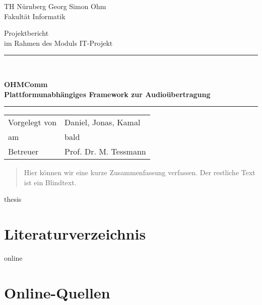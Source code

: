 \documentclass[11pt,a4paper]{report}
\begin{document}
\begin{titlepage}
  \begin{center}
    \parbox[t]{8cm}{
      TH Nürnberg Georg Simon Ohm\\
      Fakultät Informatik \\
	}
    \vfill    
    {\LARGE Projektbericht} \\[0.5cm]
    {\large im Rahmen des Moduls IT-Projekt} \\[5mm]
    \rule{\textwidth}{1pt}\\[0.5cm]
    {\begin{spacing}{1.15} \huge \bfseries OHMComm \\Plattformunabhängiges Framework zur Audioübertragung \\ \end{spacing}}
    \rule{\textwidth}{1pt}    
    \vfill    
    \begin{tabular}{ll} %
      Vorgelegt von & Daniel, Jonas, Kamal \\
      am & bald \\
      Betreuer & Prof. Dr. M. Tessmann \\
    \end{tabular}    
    \vfill
\end{center}
\end{titlepage}
\cleardoublepage

\begin{abstract} 
Hier können wir eine kurze Zusammenfassung verfassen. Der restliche Text ist ein Blindtext. \blindtext
\end{abstract}

\tableofcontents




































\begin{btSect}{thesis} %
\section*{Literaturverzeichnis}
\btPrintCited
\end{btSect}
\begin{btSect}{online}
\section*{Online-Quellen}
\btPrintCited
\end{btSect}
\end{document}
